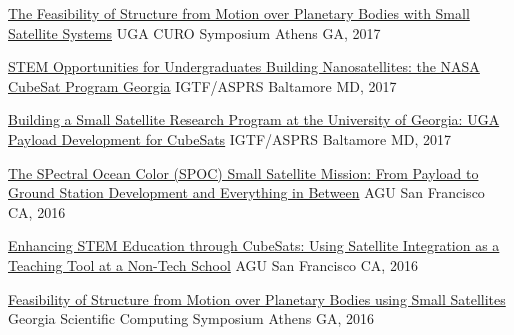 \documentclass[10pt,a4paper]{article}
\begin{document}
\headedsection
  {{\color{bluegreen} \faTelevision} \href{http://smallsat.uga.edu/images/documents/presentations/Space_SFM-2017_CURO_Syposium.pdf}{The Feasibility of Structure from Motion over Planetary Bodies with Small Satellite Systems}}{%
  \headedsubsection
    {UGA CURO Symposium}
    {Athens GA, 2017}
    {}
}

\headedsection
  {{\color{bluegreen} \faTelevision} \href{http://smallsat.uga.edu/images/documents/posters/2017-ASPRS-IGTF-1-STEMopprotunities.pdf}{STEM Opportunities for Undergraduates Building Nanosatellites: the NASA CubeSat Program Georgia}}{%
  \headedsubsection
    {IGTF/ASPRS}
    {Baltamore MD, 2017}
    {}
}

\headedsection
  {{\color{bluegreen} \faTelevision} \href{http://smallsat.uga.edu/images/documents/posters/2017-ASPRS-IGTF-2-PayloadDevelopment.pdf}{Building a Small Satellite Research Program at the University of Georgia: UGA Payload Development for CubeSats}}{%
  \headedsubsection
    {IGTF/ASPRS}
    {Baltamore MD, 2017}
    {}
}

\headedsection
  {{\color{bluegreen} \faMapO} \href{http://smallsat.uga.edu/images/documents/posters/AGU2016-SPOC-final2.pdf}{The SPectral Ocean Color (SPOC) Small Satellite Mission: From Payload to Ground Station Development and Everything in Between}}{%
  \headedsubsection
    {AGU}
    {San Francisco CA, 2016}
    {}
}

\headedsection
  {{\color{bluegreen} \faMapO} \href{http://smallsat.uga.edu/images/documents/posters/AGU2016-SSRL-final3.pdf}{Enhancing STEM Education through CubeSats: Using Satellite Integration as a Teaching Tool at a Non-Tech School}}{%
  \headedsubsection
    {AGU}
    {San Francisco CA, 2016}
    {}
}

\headedsection
  {{\color{bluegreen} \faMapO} \href{http://smallsat.uga.edu/images/documents/posters/2017-GeorgiaScientificComputingSymposium\%20final.pdf}{Feasibility of Structure from Motion over Planetary Bodies using Small Satellites}}{%
  \headedsubsection
    {Georgia Scientific Computing Symposium}
    {Athens GA, 2016}
    {}
}
\end{document}
